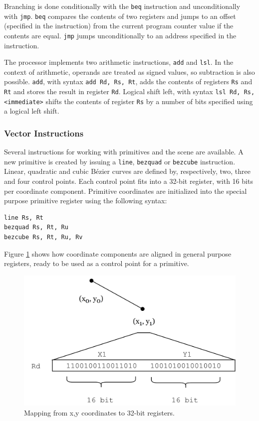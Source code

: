 Branching is done conditionally with the \texttt{beq} instruction and unconditionally with \texttt{jmp}.
\texttt{beq} compares the contents of two registers and jumps to an offset (specified in the instruction) from the current program counter value if the contents are equal.
\texttt{jmp} jumps unconditionally to an address specified in the instruction.

The processor implements two arithmetic instructions, \texttt{add} and \texttt{lsl}.
In the context of arithmetic, operands are treated as signed values, so subtraction is also possible.
\texttt{add}, with syntax \texttt{add Rd, Rs, Rt}, adds the contents of registers \texttt{Rs} and \texttt{Rt} and stores the result in register \texttt{Rd}.
Logical shift left, with syntax \texttt{lsl Rd, Rs, <immediate>} shifts the contents of register \texttt{Rs} by a number of bits specified using a logical left shift.

\subsubsection{Vector Instructions}

Several instructions for working with primitives and the scene are available.
A new primitive is created by issuing a \texttt{line}, \texttt{bezquad} or \texttt{bezcube} instruction.
Linear, quadratic and cubic Bézier curves are defined by, respectively, two, three and four control points.
Each control point fits into a 32-bit register, with 16 bits per coordinate component.
Primitive coordinates are initialized into the special purpose primitive register using the following syntax:

\begin{lstlisting}[label=lst:primitive-initialization]
line Rs, Rt
bezquad Rs, Rt, Ru
bezcube Rs, Rt, Ru, Rv
\end{lstlisting}

Figure \ref{fig:primitive-data-mapping} shows how coordinate components are aligned in general purpose registers, ready to be used as a control point for a primitive.

\begin{figure}[H]
    \includegraphics[width=\linewidth]{images/primitive-data-mapping.png}
    \caption{Mapping from x,y coordinates to 32-bit registers.}
    \label{fig:primitive-data-mapping}
\end{figure}

